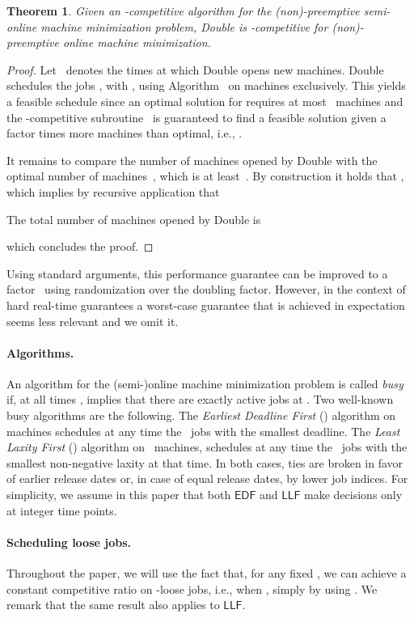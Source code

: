 \documentclass[letterpaper,11pt]{article}
\newtheorem{theorem}{Theorem}
\newcommand{\EDF}{\ensuremath{\mathsf{EDF}}\xspace}
\newcommand{\LLF}{\ensuremath{\mathsf{LLF}}\xspace}
\newcommand{\double}{{\sf Double}\xspace}
\begin{document}
\begin{theorem}\label{thm: black box}
  Given an -competitive algorithm for the (non)-preemptive semi-online machine minimization problem, \double is -competitive for  (non)-preemptive online machine minimization. \end{theorem}
\begin{proof}
  Let~ denotes the times at which \double opens new machines.
  \double schedules the jobs , with , using
  Algorithm~ on 
  machines exclusively. This yields a feasible schedule since an
  optimal solution for  requires at
  most~ machines and the
  -competitive subroutine~ is
  guaranteed to find a feasible solution given a factor  times
  more machines than optimal, i.e.,  .

  It remains to compare the number of machines opened by \double with
  the optimal number of machines~, which is at least~. By
  construction it holds that , 
  which implies by recursive application that 
  
  The total number of machines opened by \double is
  
   which concludes the proof.
   \end{proof}

Using standard arguments, this performance guarantee can be improved to a factor~ using randomization over the doubling factor. However, in the context of hard real-time guarantees a worst-case guarantee that is achieved in expectation seems less relevant and we omit it.

\paragraph{Algorithms.} An algorithm for the (semi-)online machine minimization problem is called {\em busy} if, at all times ,  implies that there are exactly  active jobs at . Two well-known busy algorithms are the following. The {\em Earliest Deadline First} () algorithm on~ machines schedules at any time the~ jobs with the smallest deadline. The {\em  Least Laxity First} () algorithm on~ machines, schedules at any time the~ jobs with the smallest non-negative laxity at that time. In both cases, ties are broken in favor of earlier release dates or, in case of equal release dates, by lower job indices. For simplicity, we assume in this paper that both \EDF and \LLF make decisions only at integer time points.

\paragraph{Scheduling loose jobs.} \label{mp-subsec: oa-edf-good}
Throughout the paper, we will use the fact that, for any fixed
, we can achieve a constant competitive ratio on
-loose jobs, i.e., when , simply by using . We remark that the same result also applies to \LLF. 
\end{document}
